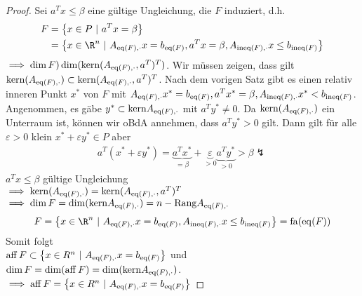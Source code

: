 \begin{proof}
	Sei $a^{T} x \leq \beta$ eine gültige Ungleichung, die $F$ induziert, d.h.
	\begin{align*}
		F &= \left\{ x \in P \ |\ a^{T} x= \beta \right\}\\
		  &= \left\{x \in \R^n \ |\ A_{\eq(F),\cdot} x = b_{\eq(F)}, a^{T} x = \beta, A_{\ineq(F),\cdot} x \leq b_{\ineq(F)} \right\}
	\end{align*}
	$\implies \dim F ) \dim(\text{kern}(A_{\operatorname{eq}(F),\cdot},a^{T} )^{T} )$.
	Wir müssen zeigen, dass gilt  $\text{kern}(A_{\operatorname{eq}(F),\cdot}) \subset  \text{kern}(A_{\operatorname{eq}(F),\cdot},a^{T} )^{T}$.
	Nach dem vorigen Satz gibt es einen relativ inneren Punkt $x^*$ von $F$ mit $A_{\operatorname{eq}(F),\cdot}x^* = b_{\operatorname{eq}(F)}, a^{T} x^* =\beta, A_{\operatorname{ineq}(F),\cdot}x^* < b_{\operatorname{ineq}(F)}$.
	Angenommen, es gäbe $y^* \subset \text{kern} A_{\operatorname{eq}(F),\cdot}$ mit $a^{T} y^* \neq 0$. Da $\text{kern}(A_{\operatorname{eq}(F),\cdot})$ ein Unterraum ist, können wir oBdA annehmen, dass $a^{T} y^* > 0 $ gilt.
	Dann gilt für alle $\varepsilon > 0$ klein $x^* + \varepsilon y^* \in P$ aber 
	\begin{align*}
		a^{T} (x^* + \varepsilon y^*) = \underbrace{a^{T} x^*}_{= \beta} + \underbrace{\varepsilon}_{>0} \underbrace{a^{T} y^*}_{>0} > \beta \lightning
	\end{align*}
	$a^{T} x \leq \beta$ gültige Ungleichung \\
	$\implies \text{kern}(A_{\operatorname{eq}(F),\cdot}) = \text{kern}( A_{\operatorname{eq}(F),\cdot}, a^{T} )^{T} $\\
	$\implies \dim F = \dim (\text{kern}A_{\operatorname{eq}(F),\cdot}  ) = n - \text{Rang}A_{\operatorname{eq}(F),\cdot} $ 
\begin{equation*}
	F = \left\{ x \in \R^n \ |\ A_{\eq(F),\cdot} x = b_{\eq(F)}, A_{\ineq(F),\cdot} x \leq b_{\ineq(F)} \right\} = \fa(\eq(F))
\end{equation*}
Somit folgt\\
$%
\aff F \subset  \left\{ x \in R^n \ |\ A_{\eq(F),\cdot}x = b_{\eq(F)} \right\}$ und $\dim F = \dim ( \operatorname{aff} F) = \dim (\text{kern}A_{\operatorname{eq}(F),\cdot})$.\\
$\implies \operatorname{aff} F = \left\{ x \in R^n \ |\ A_{\operatorname{eq}(F),\cdot}x = b_{\operatorname{eq}(F)} \right\}$
\end{proof}

